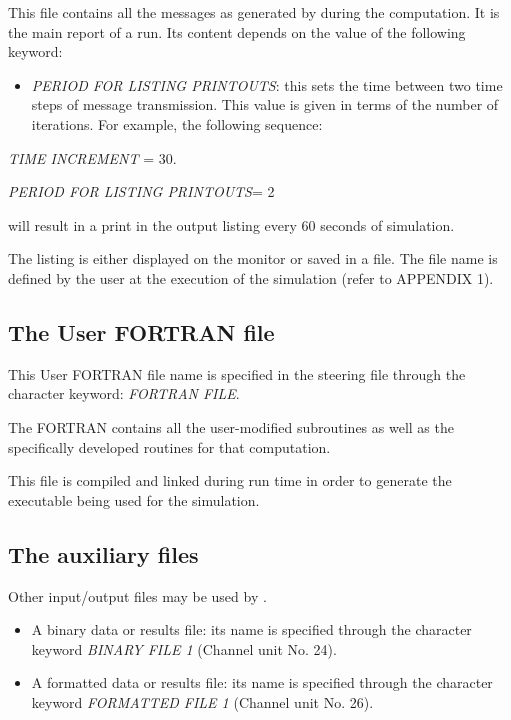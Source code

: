  This file contains all the messages as generated by \tomawac during the computation. It is the main report of a \tomawac run. Its content depends on the value of the following keyword:

\begin{itemize}
\item  \textit{PERIOD FOR LISTING PRINTOUTS}: this sets the time between two time steps of message transmission. This value is given in terms of the number of iterations. For example, the following sequence:
\end{itemize}

   \textit{TIME INCREMENT} = 30.    

\textit{PERIOD FOR LISTING PRINTOUTS}= 2 

will result in a print in the output listing every 60 seconds of simulation.

 The listing is either displayed on the monitor or saved in a file. The file name is defined by the user at the execution of the \tomawac simulation (refer to APPENDIX 1).


\subsection{ The User FORTRAN file}

 This User FORTRAN file name is specified in the steering file through the character keyword: \textit{FORTRAN FILE}.\textit{}

 The FORTRAN contains all the user-modified \tomawac subroutines as well as the specifically developed routines for that computation.

 This file is compiled and linked during run time in order to generate the executable being used for the simulation.


\subsection{ The auxiliary files}

 Other input/output files may be used by \tomawac.

\begin{itemize}
\item  A binary data or results file: its name is specified through the character keyword \textit{BINARY FILE 1} (Channel unit No. 24).

\item  A formatted data or results file: its name is specified through the character keyword \textit{FORMATTED FILE 1} (Channel unit No. 26).
\end{itemize}

